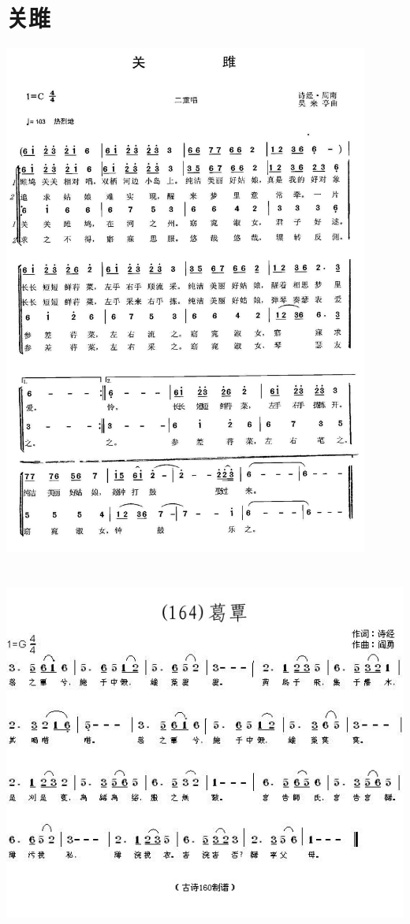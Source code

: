 \documentclass[cn,pad,twocol]{elegantbook}
\begin{document}
\section{关雎}      \includegraphics[width=0.9\textwidth]{rpi400/20210123-关雎.jpg}
\section{}      \includegraphics[width=\textwidth]{rpi400/20210123-葛覃.jpg}
\end{document}
